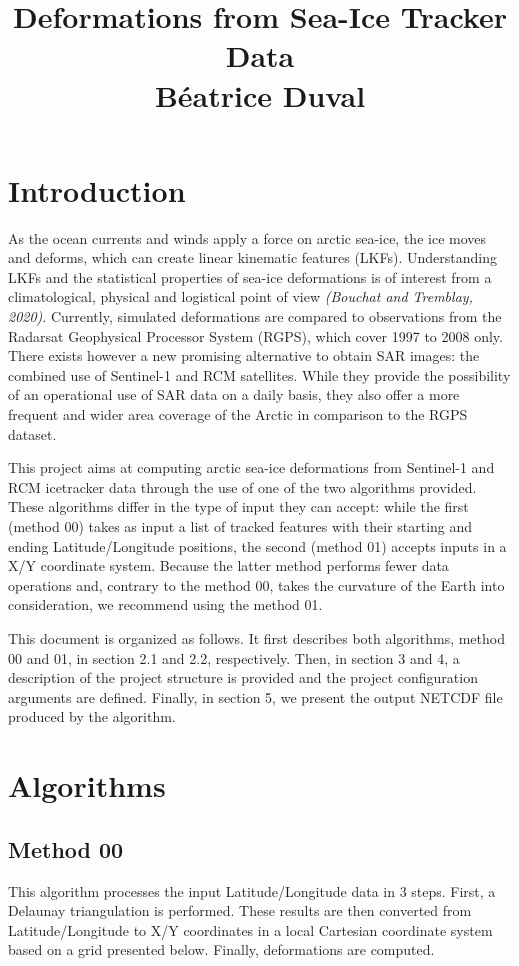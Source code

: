 \documentclass[draft]{agujournal2018}
\begin{document}
\title{%
  Deformations from Sea-Ice Tracker Data \\
  \large Béatrice Duval}

\section{Introduction}

As the ocean currents and winds apply a force on arctic sea-ice, the ice moves and deforms, which can create linear kinematic features (LKFs). Understanding LKFs and the statistical properties of sea-ice deformations is of interest from a climatological, physical and logistical point of view \textit{(Bouchat and Tremblay, 2020)}. Currently, simulated deformations are compared to observations from the Radarsat Geophysical Processor System (RGPS), which cover 1997 to 2008 only. There exists however a new promising alternative to obtain SAR images: the combined use of Sentinel-1 and RCM satellites. While they provide the possibility of an operational use of SAR data on a daily basis, they also offer a more frequent and wider area coverage of the Arctic in comparison to the RGPS dataset.

This project aims at computing arctic sea-ice deformations from Sentinel-1 and RCM icetracker data through the use of one of the two algorithms provided. These algorithms differ in the type of input they can accept: while the first (method 00) takes as input a list of tracked features with their starting and ending Latitude/Longitude positions, the second (method 01) accepts inputs in a X/Y coordinate system. Because the latter method performs fewer data operations and, contrary to the method 00, takes the curvature of the Earth into consideration, we recommend using the method 01.

This document is organized as follows. It first describes both algorithms, method 00 and 01, in section 2.1 and 2.2, respectively. Then, in section 3 and 4, a description of the project structure is provided and the project configuration arguments are defined. Finally, in section 5, we present the output NETCDF file produced by the algorithm.

\section{Algorithms}
\subsection{Method 00}
This algorithm processes the input Latitude/Longitude data in 3 steps. First, a Delaunay triangulation is performed. These results are then converted from Latitude/Longitude to X/Y coordinates in a local Cartesian coordinate system based on a grid presented below. Finally, deformations are computed. 
\end{document}

